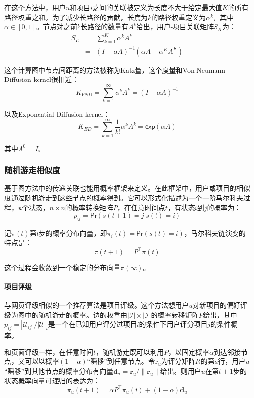 \documentclass{article}
\begin{document}
 在这个方法中，用户$u$和项目$i$之间的关联被定义为长度不大于给定最大值$K$的所有路径权重之和。为了减少长路径的贡献，长度为$k$的路径权重定义为$\alpha^k$，其中$\alpha\in[0,1]$。节点对之前$k$长路径的数量有$A^k$给出，用户-项目关联矩阵$S_K$为：
 \[
 \begin{array}{lll}
 S_K & = & \mathop{\sum}\limits_{k=1}^K\alpha^kA^k\\
     & = & (I-\alpha A)^{-1}(\alpha A-\alpha^KA^K)
 \end{array}
 \]

 这个计算图中节点间距离的方法被称为Katz量，这个度量和Von Neumann Diffusion kernel很相近：
 $$ K_{VND}=\mathop{\sum}\limits_{k=1}^{\infty}\alpha^kA^k=(I-\alpha A)^{-1} $$

 以及Exponential Diffusion kernel：
 $$ K_{ED}=\mathop{\sum}\limits_{k=1}^{\infty}\frac{1}{k!}\alpha^kA^k=\mathsf{exp}(\alpha A) $$

 其中$A^0=I$。

 \subsubsection{随机游走相似度}
 基于图方法中的传递关联也能用概率框架来定义。在此框架中，用户或项目的相似度通过随机游走到这些节点的概率得到。它可以形式化描述为一个一阶马尔科夫过程，$n$个状态，$n\times n$的概率转换矩阵$P$，在任意时间点$t$，有状态$i$到$j$的概率为：
 $$ p_{ij}=\mathsf{Pr}(s(t+1)=j|s(t)=i) $$

 记$\pi(t)$第$t$步的概率分布向量，即$\pi_i(t)=\mathsf{Pr}(s(t)=i)$，马尔科夫链演变的特点是：
 $$ \pi(t+1)=P^{\top}\pi(t) $$

 这个过程会收敛到一个稳定的分布向量$\pi(\infty)$。

 \paragraph{项目评级}
 与网页评级相似的一个推荐算法是项目评级。这个方法想用户$u$对新项目的偏好评级为图中的随机游走的概率。边的权重由$|\mathcal{I}|\times|\mathcal{I}|$的概率转移矩阵$P$给出，其中$p_{ij}=|\mathcal{U}_{ij}|/|\mathcal{U}|_i$是一个在已知用户评分过项目$i$的条件下用户评分项目$j$的条件概率。

 和页面评级一样，在任意时间$t$，随机游走既可以利用$P$，以固定概率$\alpha$到达邻接节点，又可以以概率$(1-\alpha)$“瞬移”到任意节点。令$\mathbf{r}_u$为评分矩阵$R$的第$u$行，用户$u$“瞬移”到其他节点的概率分布有向量$\mathbf{d}_u=\mathbf{r}_u/\|\mathbf{r}_u\|$给出。则用户$u$在第$t+1$步的状态概率向量可递归的表达为：
 $$ \pi_u(t+1)=\alpha P^{\top}\pi_u(t)+(1-\alpha)\mathbf{d}_u $$
\end{document}
